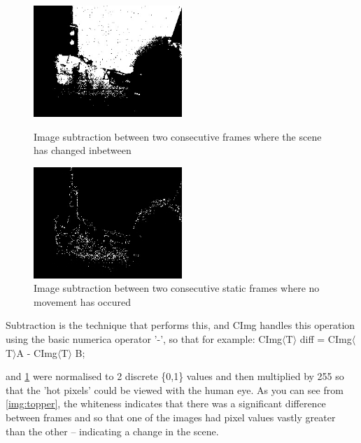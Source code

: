 {{\subsubsection*{}
\begin{figure}
	\vspace{-40pt}
	\begin{center}
		\includegraphics[width=0.5\textwidth]{../images/subG}
	\end{center}
	\vspace{-20pt}
	\caption{Image subtraction between two consecutive frames where the scene has changed inbetween}\label{img:topper}
	\vspace{10pt}
	\begin{center}
		\includegraphics[width=0.5\textwidth]{../images/subF}
	\end{center}
	\vspace{-20pt}
	\caption{Image subtraction between two consecutive static frames where no movement has occured}\label{img:botter}
	\vspace{-10pt}
\end{figure}
Subtraction is the technique that performs this, and CImg handles this operation using the basic numerica operator '-', so that for example: CImg\(\langle\)T\(\rangle\) diff = CImg\(\langle\)T\(\rangle\)A - CImg\(\langle\)T\(\rangle\) B;

 and \cref{img:botter} were normalised to 2 discrete \{0,1\} values and then multiplied by 255 so that the 'hot pixels' could be viewed with the human eye. As you can see from \cref{img:topper}, the whiteness indicates that there was a significant difference between frames and so that one of the images had pixel values vastly greater than the other -- indicating a change in the scene.

}}
